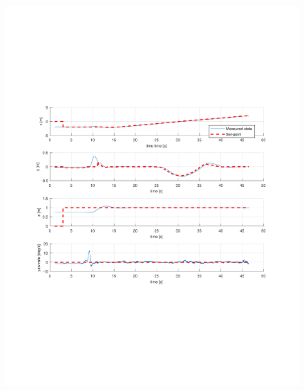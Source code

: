 \documentclass[numbered,pdftex]{ohio-etd}
\begin{document}
\begin{figure}[H]
	\centering
	\includegraphics[trim = 65 200 0 200, clip, width=17cm]{Figures/results/compareFigures/2Controller}
	\caption{}
	\label{fig:2Controller}
\end{figure}
\end{document}
